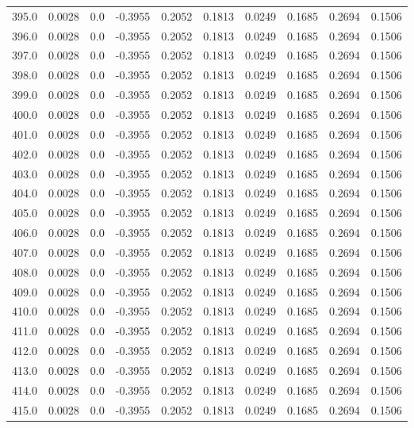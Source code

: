 \begin{longtable}{lrrrrrrrrr}
395.0 & 0.0028 & 0.0 & -0.3955 & 0.2052 & 0.1813 & 0.0249 & 0.1685 & 0.2694 & 0.1506 \\
396.0 & 0.0028 & 0.0 & -0.3955 & 0.2052 & 0.1813 & 0.0249 & 0.1685 & 0.2694 & 0.1506 \\
397.0 & 0.0028 & 0.0 & -0.3955 & 0.2052 & 0.1813 & 0.0249 & 0.1685 & 0.2694 & 0.1506 \\
398.0 & 0.0028 & 0.0 & -0.3955 & 0.2052 & 0.1813 & 0.0249 & 0.1685 & 0.2694 & 0.1506 \\
399.0 & 0.0028 & 0.0 & -0.3955 & 0.2052 & 0.1813 & 0.0249 & 0.1685 & 0.2694 & 0.1506 \\
400.0 & 0.0028 & 0.0 & -0.3955 & 0.2052 & 0.1813 & 0.0249 & 0.1685 & 0.2694 & 0.1506 \\
401.0 & 0.0028 & 0.0 & -0.3955 & 0.2052 & 0.1813 & 0.0249 & 0.1685 & 0.2694 & 0.1506 \\
402.0 & 0.0028 & 0.0 & -0.3955 & 0.2052 & 0.1813 & 0.0249 & 0.1685 & 0.2694 & 0.1506 \\
403.0 & 0.0028 & 0.0 & -0.3955 & 0.2052 & 0.1813 & 0.0249 & 0.1685 & 0.2694 & 0.1506 \\
404.0 & 0.0028 & 0.0 & -0.3955 & 0.2052 & 0.1813 & 0.0249 & 0.1685 & 0.2694 & 0.1506 \\
405.0 & 0.0028 & 0.0 & -0.3955 & 0.2052 & 0.1813 & 0.0249 & 0.1685 & 0.2694 & 0.1506 \\
406.0 & 0.0028 & 0.0 & -0.3955 & 0.2052 & 0.1813 & 0.0249 & 0.1685 & 0.2694 & 0.1506 \\
407.0 & 0.0028 & 0.0 & -0.3955 & 0.2052 & 0.1813 & 0.0249 & 0.1685 & 0.2694 & 0.1506 \\
408.0 & 0.0028 & 0.0 & -0.3955 & 0.2052 & 0.1813 & 0.0249 & 0.1685 & 0.2694 & 0.1506 \\
409.0 & 0.0028 & 0.0 & -0.3955 & 0.2052 & 0.1813 & 0.0249 & 0.1685 & 0.2694 & 0.1506 \\
410.0 & 0.0028 & 0.0 & -0.3955 & 0.2052 & 0.1813 & 0.0249 & 0.1685 & 0.2694 & 0.1506 \\
411.0 & 0.0028 & 0.0 & -0.3955 & 0.2052 & 0.1813 & 0.0249 & 0.1685 & 0.2694 & 0.1506 \\
412.0 & 0.0028 & 0.0 & -0.3955 & 0.2052 & 0.1813 & 0.0249 & 0.1685 & 0.2694 & 0.1506 \\
413.0 & 0.0028 & 0.0 & -0.3955 & 0.2052 & 0.1813 & 0.0249 & 0.1685 & 0.2694 & 0.1506 \\
414.0 & 0.0028 & 0.0 & -0.3955 & 0.2052 & 0.1813 & 0.0249 & 0.1685 & 0.2694 & 0.1506 \\
415.0 & 0.0028 & 0.0 & -0.3955 & 0.2052 & 0.1813 & 0.0249 & 0.1685 & 0.2694 & 0.1506 \\

\end{longtable}
